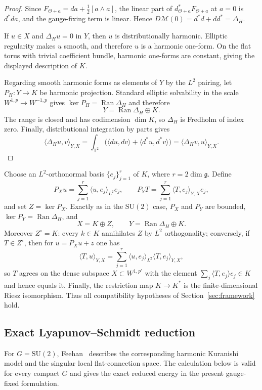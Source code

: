 \documentclass[11pt]{article}
\theoremstyle{definition}
\theoremstyle{remark}
\begin{document}
\begin{proof}
Since $F_{\Theta+a}=da+\frac12[a\wedge a]$, the linear part of $d_{\Theta+a}^*F_{\Theta+a}$ at $a=0$ is $d^*da$, and the gauge-fixing term is linear. Hence $D\mathcal M(0)=d^*d+dd^*=\Delta_H$.

If $u\in X$ and $\Delta_Hu=0$ in $Y$, then $u$ is distributionally harmonic. Elliptic regularity makes $u$ smooth, and therefore $u$ is a harmonic one-form. On the flat torus with trivial coefficient bundle, harmonic one-forms are constant, giving the displayed description of $K$.

Regarding smooth harmonic forms as elements of $Y$ by the $L^2$ pairing, let $P_H:Y\to K$ be harmonic projection. Standard elliptic solvability in the scale $W^{1,p}\to W^{-1,p}$ gives $\ker P_H=\operatorname{Ran}\Delta_H$ and therefore
$$Y=\operatorname{Ran}\Delta_H\oplus K.$$
The range is closed and has codimension $\dim K$, so $\Delta_H$ is Fredholm of index zero. Finally, distributional integration by parts gives
$$
\langle\Delta_Hu,v\rangle_{Y,X}
=\int_{\mathbb T^2}\bigl(\langle du,dv\rangle+\langle d^*u,d^*v\rangle\bigr)
=\langle\Delta_Hv,u\rangle_{Y,X}.
$$
\end{proof}

Choose an $L^2$-orthonormal basis $\{e_j\}_{j=1}^r$ of $K$, where $r=2\dim\mathfrak g$. Define
$$
P_Xu=\sum_{j=1}^r\langle u,e_j\rangle_{L^2}e_j,
\qquad
P_YT=\sum_{j=1}^r\langle T,e_j\rangle_{Y,X}e_j,
$$
and set $Z=\ker P_X$. Exactly as in the $\mathrm{SU}(2)$ case, $P_X$ and $P_Y$ are bounded, $\ker P_Y=\operatorname{Ran}\Delta_H$, and
$$
X=K\oplus Z,
\qquad
Y=\operatorname{Ran}\Delta_H\oplus K.
$$
Moreover $Z^\circ=K$: every $k\in K$ annihilates $Z$ by $L^2$ orthogonality; conversely, if $T\in Z^\circ$, then for $u=P_Xu+z$ one has
$$
\langle T,u\rangle_{Y,X}
=\sum_{j=1}^r\langle u,e_j\rangle_{L^2}\langle T,e_j\rangle_{Y,X},
$$
so $T$ agrees on the dense subspace $X\subset W^{1,p'}$ with the element
$\sum_j\langle T,e_j\rangle e_j\in K$ and hence equals it. Finally, the restriction map $K\to K^*$ is the finite-dimensional Riesz isomorphism. Thus all compatibility hypotheses of Section~\ref{sec:framework} hold.

\subsection{Exact Lyapunov--Schmidt reduction}

For $G=\mathrm{SU}(2)$, Feehan~\cite[Example~A.2 and Theorem~A.4]{FeehanFlat2019} describes the corresponding harmonic Kuranishi model and the singular local flat-connection space. The calculation below is valid for every compact $G$ and gives the exact reduced energy in the present gauge-fixed formulation.
\end{document}
